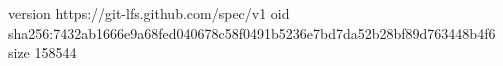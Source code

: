 version https://git-lfs.github.com/spec/v1
oid sha256:7432ab1666e9a68fed040678c58f0491b5236e7bd7da52b28bf89d763448b4f6
size 158544
